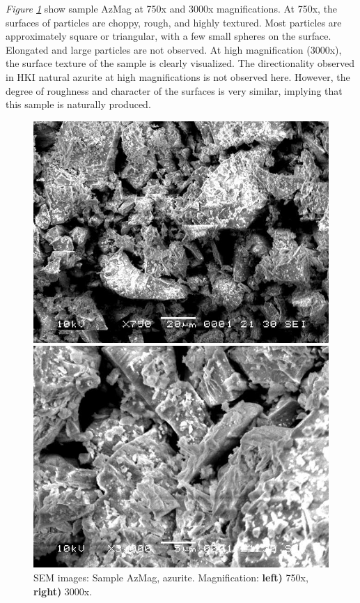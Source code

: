 \textit{Figure \ref{fig:azmag_sem_1}} show sample AzMag at 750x and 3000x magnifications. At 750x, the surfaces of particles are choppy, rough, and highly textured. Most particles are approximately square or triangular, with a few small spheres on the surface. Elongated and large particles are not observed. At high magnification (3000x), the surface texture of the sample is clearly visualized. The directionality observed in HKI natural azurite at high magnifications is not observed here. However, the degree of roughness and character of the surfaces is very similar, implying that this sample is naturally produced.

\begin{figure}[H]
\centering
\begin{minipage}{.45\textwidth}
  \centering
  \includegraphics[width=\linewidth]{AzMag_x750_1_160321}
\end{minipage}
\begin{minipage}{.45\textwidth}
  \centering
  \includegraphics[width=\linewidth]{AzMag_x3000_1_160321}
\end{minipage}
\caption[SEM images: Sample AzMag, azurite]{SEM images: Sample AzMag, azurite. Magnification: \textbf{left)} 750x, \textbf{right)} 3000x.}
\label{fig:azmag_sem_1}
\end{figure}




